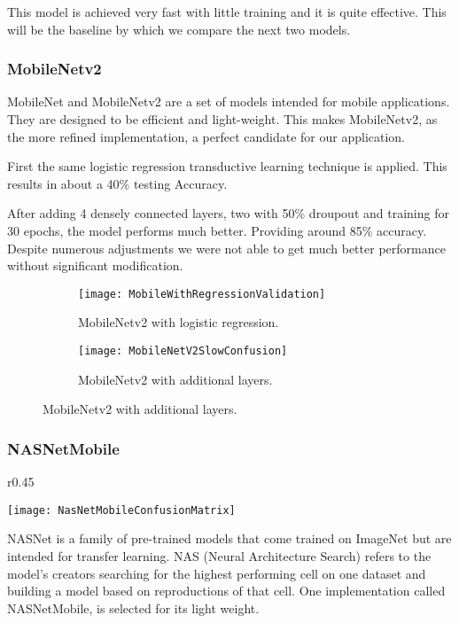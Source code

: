 \documentclass[]{article}
\begin{document}
This model is achieved very fast with little training and it is quite effective.
This will be the baseline by which we compare the next two models.

\subsubsection{MobileNetv2}

MobileNet\cite{Howard2017} and MobileNetv2\cite{Sandler2019} 
are a set of models intended for mobile applications.
They are designed to be efficient and light-weight.
This makes MobileNetv2, as the more refined implementation,
a perfect candidate for our application.  

First the same logistic regression transductive learning technique is applied.
This results in about a 40\% testing Accuracy.

After adding 4 densely connected layers, two with 50\% droupout and training for 30 epochs, the model performs much better. Providing around 85\% accuracy. Despite numerous adjustments we were not able to get much better performance without significant modification.

\begin{figure}[H]
	\centering
	\begin{subfigure}[b]{0.49\textwidth}
		\texttt{[image: MobileWithRegressionValidation]}
		\caption{MobileNetv2 with logistic regression.}	
	\end{subfigure}
	\hfill
	\begin{subfigure}[b]{0.49\textwidth}
		\texttt{[image: MobileNetV2SlowConfusion]}
		\caption{MobileNetv2 with additional layers.}	
	\end{subfigure}
\end{figure}

\subsubsection{NASNetMobile}

\begin{wrapfigure}{r}{0.45\textwidth}
	\vspace{-4em}
	\begin{center}
		\texttt{[image: NasNetMobileConfusionMatrix]}
	\end{center}
	\caption{NASNetMobile with additional layers.}	
\end{wrapfigure}

NASNet is a family of pre-trained models that come trained on ImageNet but are intended for transfer learning.
NAS (Neural Architecture Search) refers to the model's creators searching for the highest performing cell on one dataset and building a model based on reproductions of that cell\cite{Zoph2018}. 
One implementation called NASNetMobile, is selected for its light weight.
\end{document}
